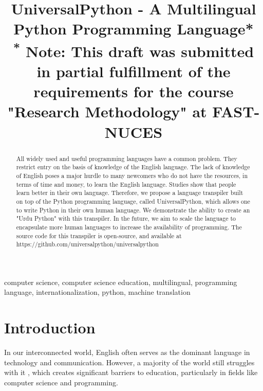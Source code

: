 \documentclass[conference]{IEEEtran}
\begin{document}
\title{UniversalPython - A Multilingual Python Programming Language*\\
{\footnotesize \textsuperscript{*}
Note: This draft was submitted in partial fulfillment of the requirements for the course "Research Methodology"
at FAST-NUCES
}
}

\author{
}

\maketitle

\begin{abstract}
  All widely used and useful programming languages have a common problem. They restrict entry on the basis of knowledge of the English language. The lack of knowledge of English poses a major hurdle to many newcomers who do not have the resources, in terms of time and money, to learn the English language. Studies show that people learn better in their own language. Therefore, we propose a language transpiler built on top of the Python programming language, called UniversalPython, which allows one to write Python in their own human language. We demonstrate the ability to create an "Urdu Python" with this transpiler. In the future, we aim to scale the language to encapsulate more human languages to increase the availability of programming. The source code for this transpiler is open-source, and available at https://github.com/universalpython/universalpython
\end{abstract}

\begin{IEEEkeywords}
computer science, computer science education, multilingual, programming language, internationalization, python, machine translation
\end{IEEEkeywords}

\section{Introduction}
In our interconnected world, English often serves as the dominant language in technology and communication. However, a majority of the world still struggles with it \cite{cia_world_factbook_people_and_society}, which creates significant barriers to education, particularly in fields like computer science and programming.
\end{document}
